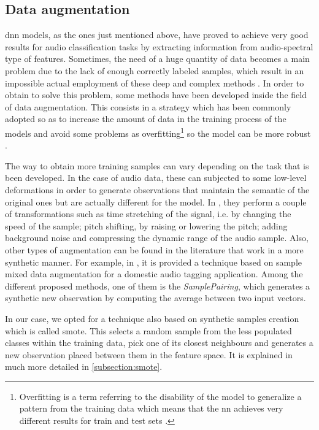 	


\subsection{Data augmentation}
\label{subsection:data-augmentation}

	\acrlong{dnn} models, as the ones just mentioned above, have proved to achieve very good results for audio classification tasks by extracting information from audio-spectral type of features. Sometimes, the need of a huge quantity of data becomes a main problem due to the lack of enough correctly labeled samples, which result in an impossible actual employment of these deep and complex methods \cite{Salamon2017}. In order to obtain to solve this problem, some methods have been developed inside the field of data augmentation. This consists in a strategy which has been commonly adopted so as to increase the amount of data in the training process of the models and avoid some problems as overfitting\footnote{Overfitting is a term referring to the disability of the model to generalize a pattern from the training data which means that the \acrshort{nn} achieves very different results for train and test sets \cite{Jabbar2015}.} so the model can be more robust \cite{Ko2015}.
	
	The way to obtain more training samples can vary depending on the task that is been developed. In the case of audio data, these can subjected to some low-level deformations in order to generate observations that maintain the semantic of the original ones but are actually different for the model. In \cite{Salamon2017a}, they perform a couple of transformations such as time stretching of the signal, i.e. by changing the speed of the sample; pitch shifting, by raising or lowering the pitch; adding background noise and compressing the dynamic range of the audio sample. Also, other types of augmentation can be found in the literature that work in a more synthetic manner. For example, in \cite{Wei2018}, it is provided a technique based on sample mixed data augmentation for a domestic audio tagging application. Among the different proposed methods, one of them is the \textit{SamplePairing}, which generates a synthetic new observation by computing the average between two input vectors.
	
	In our case, we opted for a technique also based on synthetic samples creation which is called \acrfull{smote}. This selects a random sample from the less populated classes within the training data, pick one of its closest neighbours and generates a new observation placed between them in the feature space. It is explained in much more detailed in \ref{subsection:smote}.
	
